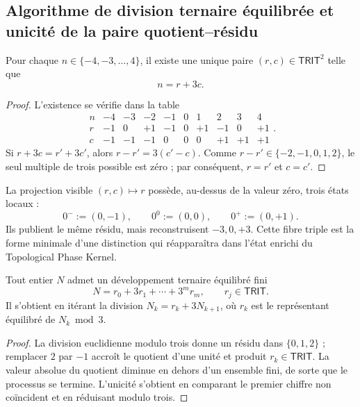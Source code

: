 \subsection{Algorithme de division ternaire équilibrée et unicité de la paire quotient–résidu}

\begin{theorem}
\label{p12-83-c1-s11:thm:trit-levantamiento-local}
Pour chaque \(n\in\{-4,-3,\ldots,4\}\), il existe une unique paire
\((r,c)\in\mathsf{TRIT}^2\) telle que
\[
 n=r+3c.
\]
\end{theorem}

\begin{proof}
L’existence se vérifie dans la table
\[
\begin{array}{c|rrrrrrrrr}
n&-4&-3&-2&-1&0&1&2&3&4\\\hline
r&-1&0&+1&-1&0&+1&-1&0&+1\\
c&-1&-1&-1&0&0&0&+1&+1&+1
\end{array}.
\]
Si \(r+3c=r'+3c'\), alors \(r-r'=3(c'-c)\). Comme
\(r-r'\in\{-2,-1,0,1,2\}\), le seul multiple de trois possible est zéro ;
par conséquent, \(r=r'\) et \(c=c'\).
\end{proof}

La projection visible \((r,c)\mapsto r\) possède, au-dessus de la valeur zéro, trois
états locaux :
\[
 0^-:=(0,-1),
 \qquad
 0^0:=(0,0),
 \qquad
 0^+:=(0,+1).
\]
Ils publient le même résidu, mais reconstruisent \(-3,0,+3\). Cette fibre triple
est la forme minimale d’une distinction qui réapparaîtra dans l’état enrichi
du Topological Phase Kernel.

\begin{corollary}
\label{p12-83-c1-s11:cor:trit-iteracion-balanceada}
Tout entier \(N\) admet un développement ternaire équilibré fini
\[
 N=r_0+3r_1+\cdots+3^mr_m,
 \qquad r_j\in\mathsf{TRIT}.
\]
Il s’obtient en itérant la division \(N_k=r_k+3N_{k+1}\), où \(r_k\) est le
représentant équilibré de \(N_k\bmod3\).
\end{corollary}

\begin{proof}
La division euclidienne modulo trois donne un résidu dans \(\{0,1,2\}\) ; remplacer
\(2\) par \(-1\) accroît le quotient d’une unité et produit
\(r_k\in\mathsf{TRIT}\). La valeur absolue du quotient diminue en dehors
d’un ensemble fini, de sorte que le processus se termine. L’unicité s’obtient
en comparant le premier chiffre non coïncident et en réduisant modulo trois.
\end{proof}

